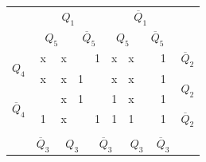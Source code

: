 \documentclass[a4paper,14pt]{article}
\begin{document}
\begin{table}[H]
\begin{minipage}{.5\linewidth}
\begin{tabular}{cccccccccc}
\end{tabular}
	\end{minipage}%
	\begin{minipage}{.5\linewidth}
		\centering
\begin{tabular}{cccccccccc}
	& \multicolumn{4}{c}{$Q_1$}                                                                         & \multicolumn{4}{c}{$\overline{Q}_1$}                                                             &                        \\
	& \multicolumn{2}{c}{$Q_5$}                       & \multicolumn{2}{c}{$\overline{Q}_5$}            & \multicolumn{2}{c}{$Q_5$}                       & \multicolumn{2}{c}{$\overline{Q}_5$}           &                        \\ \cline{2-9}
	\multicolumn{1}{c|}{\multirow{2}{*}{$Q_4$}}            & \multicolumn{1}{c|}{x} & \multicolumn{1}{c|}{x} & \multicolumn{1}{c|}{}  & \multicolumn{1}{c|}{1} & \multicolumn{1}{c|}{x} & \multicolumn{1}{c|}{x} & \multicolumn{1}{c|}{} & \multicolumn{1}{c|}{1} & $\overline{Q}_2$       \\ \cline{2-9}
	\multicolumn{1}{c|}{}                                  & \multicolumn{1}{c|}{x} & \multicolumn{1}{c|}{x} & \multicolumn{1}{c|}{1} & \multicolumn{1}{c|}{}  & \multicolumn{1}{c|}{x} & \multicolumn{1}{c|}{x} & \multicolumn{1}{c|}{} & \multicolumn{1}{c|}{1} & \multirow{2}{*}{$Q_2$} \\ \cline{2-9}
	\multicolumn{1}{c|}{\multirow{2}{*}{$\overline{Q}_4$}} & \multicolumn{1}{c|}{}  & \multicolumn{1}{c|}{x} & \multicolumn{1}{c|}{1} & \multicolumn{1}{c|}{}  & \multicolumn{1}{c|}{1} & \multicolumn{1}{c|}{x} & \multicolumn{1}{c|}{} & \multicolumn{1}{c|}{1} &                        \\ \cline{2-9}
	\multicolumn{1}{c|}{}                                  & \multicolumn{1}{c|}{1} & \multicolumn{1}{c|}{x} & \multicolumn{1}{c|}{}  & \multicolumn{1}{c|}{1} & \multicolumn{1}{c|}{1} & \multicolumn{1}{c|}{1} & \multicolumn{1}{c|}{} & \multicolumn{1}{c|}{1} & $\overline{Q}_2$       \\ \cline{2-9}
	&                        & \multicolumn{2}{c}{}                            & \multicolumn{2}{c}{}                            & \multicolumn{2}{c}{}                           &                        &                        \\
	& $\overline{Q}_3$       & \multicolumn{2}{c}{$Q_3$}                       & \multicolumn{2}{c}{$\overline{Q}_3$}            & \multicolumn{2}{c}{$Q_3$}                      & $\overline{Q}_3$       &                       
\end{tabular}
	\end{minipage} 
\end{table}
\end{document}
